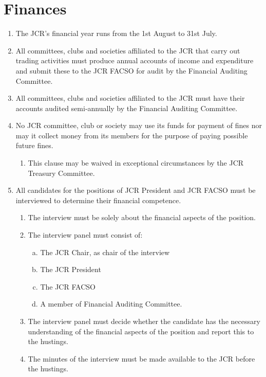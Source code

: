 \documentclass[12pt]{article}  %
\begin{document}
\section{Finances}
\begin{enumerate}
    \item The JCR’s financial year runs from the 1st August to 31st July.
    \item All committees, clubs and societies affiliated to the JCR that carry out trading activities must produce annual accounts of income and expenditure and submit these to the JCR FACSO for audit by the Financial Auditing Committee.
    \item All committees, clubs and societies affiliated to the JCR must have their accounts audited semi-annually by the Financial Auditing Committee.
    \item No JCR committee, club or society may use its funds for payment of fines nor may it collect money from its members for the purpose of paying possible future fines.
    \begin{enumerate}
        \item This clause may be waived in exceptional circumstances by the JCR Treasury Committee.
    \end{enumerate}
    \item All candidates for the positions of JCR President and JCR FACSO must be interviewed to determine their financial competence.
    \begin{enumerate}
        \item The interview must be solely about the financial aspects of the position.
        \item The interview panel must consist of:
        \begin{enumerate}[(a)]
            \item The JCR Chair, as chair of the interview
            \item The JCR President
            \item The JCR FACSO
            \item A member of Financial Auditing Committee.
        \end{enumerate}
        \item The interview panel must decide whether the candidate has the necessary understanding of the financial aspects of the position and report this to the hustings.
        \item The minutes of the interview must be made available to the JCR before the hustings.
    \end{enumerate}

\end{enumerate}
\end{document}
